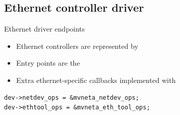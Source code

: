 \subsection{Ethernet controller driver}

\begin{frame}[fragile]{Ethernet driver endpoints}
	\begin{itemize}
		\item Ethernet controllers are represented by 
		\item Entry points are the 
		\item Extra ethernet-specific callbacks implemented with 
	\end{itemize}
	\begin{verbatim}
dev->netdev_ops = &mvneta_netdev_ops;
dev->ethtool_ops = &mvneta_eth_tool_ops;
	\end{verbatim}
\end{frame}

